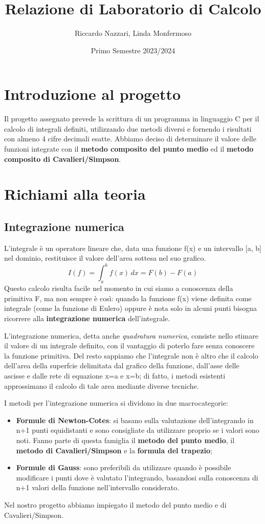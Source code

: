 \documentclass{article}
\title{Relazione di Laboratorio di Calcolo}
\author{Riccardo Nazzari, Linda Monfermoso}
\date{Primo Semestre 2023/2024}
\begin{document}
\maketitle

\section{Introduzione al progetto}
Il progetto assegnato prevede la scrittura di un programma in linguaggio C per il calcolo di integrali definiti,
utilizzando due metodi diversi e fornendo i risultati con almeno 4 cifre decimali esatte. Abbiamo deciso di determinare
il valore delle funzioni integrate con il \textbf{metodo composito del punto medio} ed il \textbf{metodo composito di Cavalieri/Simpson}.
\section{Richiami alla teoria}
\subsection{Integrazione numerica}
L'integrale è un operatore lineare che, data una funzione f(x) e un intervallo [a, b] nel dominio, restituisce il valore 
dell'area sottesa nel suo grafico. 
\begin{equation*}
   I(f) =  \int_{a}^{b} f(x)\, dx = F(b) - F(a)
\end{equation*}
Questo calcolo risulta facile nel momento in cui siamo a conoscenza della primitiva F, ma non sempre è così: quando la funzione
f(x) viene definita come integrale (come la funzione di Eulero) oppure è nota solo in alcuni punti bisogna ricorrere alla
\textbf{integrazione numerica} dell'integrale.

L'integrazione numerica, detta anche \textit{quadratura numerica}, consiste nello stimare il valore di un integrale definito, 
con il vantaggio di poterlo fare senza conoscere la funzione primitiva. Del resto sappiamo che l'integrale non è altro che il calcolo 
dell'area della superfcie delimitata dal grafico della funzione, dall'asse delle ascisse e dalle rete di equazione x=a e x=b; di fatto, i 
metodi esistenti approssimano il calcolo di tale area mediante diverse tecniche.

I metodi per l'integrazione numerica si dividono in due macrocategorie:
\begin{itemize}
   \item \textbf{Formule di Newton-Cotes}: si basano sulla valutazione dell'integrando in n+1 punti equidistanti e sono consigliate da utilizzare proprio se i 
   valori sono noti. Fanno parte di questa famiglia il \textbf{metodo del punto medio}, il \textbf{metodo di Cavalieri/Simpson} e la \textbf{formula del trapezio};
   \item \textbf{Formule di Gauss}: sono preferibili da utilizzare quando è possibile modificare i punti dove è valutato l'integrando, basandosi 
   sulla conoscenza di n+1 valori della funzione nell'intervallo considerato.
\end{itemize}
Nel nostro progetto abbiamo impiegato il metodo del punto medio e di Cavalieri/Simpson.
\end{document}
